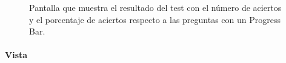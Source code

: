 \begin{figure}[H]%
  \centering
  \qquad
  \caption{Pantalla que muestra el resultado del test con el número de aciertos y el porcentaje de aciertos respecto a las preguntas con un Progress Bar.}%
  \label{fig:fin_test}%
\end{figure}

\paragraph*{Vista}
\label{sec:vista}

